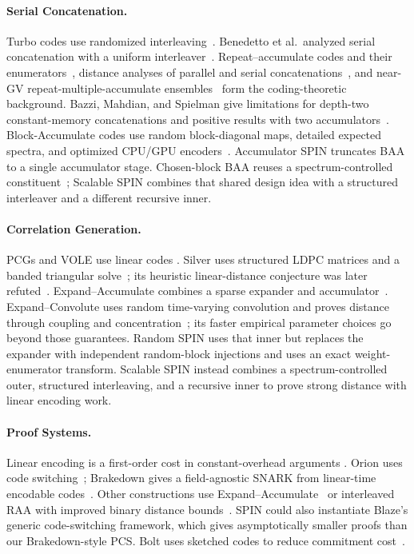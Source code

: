 \paragraph{Serial Concatenation.}
Turbo codes use randomized interleaving~\cite{berrou93}.
Benedetto et al.\ analyzed serial concatenation with a uniform
interleaver~\cite{benedetto98}. Repeat--accumulate codes and their
enumerators~\cite{divsalar98}, distance analyses of parallel and serial
concatenations~\cite{kahale98}, and near-GV repeat-multiple-accumulate
ensembles~\cite{kliewer08} form the coding-theoretic background.
Bazzi, Mahdian, and Spielman give limitations for depth-two constant-memory
concatenations and positive results with two accumulators~\cite{bms09}.
Block-Accumulate codes use random block-diagonal maps, detailed expected
spectra, and optimized CPU/GPU encoders~\cite{KolesnikovEtAl2026BA}.
Accumulator SPIN truncates BAA to a single accumulator stage.
Chosen-block BAA reuses a spectrum-controlled constituent~\cite{cryptoeprint:2026/1903};
Scalable SPIN combines that shared design idea with a structured interleaver
and a different recursive inner.

\paragraph{Correlation Generation.}
PCGs and VOLE use linear codes
\cite{bcgi18,bcg19pcg,bcg19tworound,ferret20,bcg20ring}.
Silver uses structured LDPC matrices and a banded triangular
solve~\cite{CouteauRindalRaghuraman2021Silver}; its heuristic
linear-distance conjecture was later refuted~\cite{RaghuramanRindalTanguy2023EC}.
Expand--Accumulate combines a sparse expander and accumulator~\cite{ea22}.
Expand--Convolute uses random time-varying convolution and proves distance
through coupling and concentration~\cite{RaghuramanRindalTanguy2023EC};
its faster empirical parameter choices go beyond those guarantees.
Random SPIN uses that inner but replaces the expander with independent
random-block injections and uses an exact weight-enumerator transform.
Scalable SPIN instead combines a spectrum-controlled outer, structured
interleaving, and a recursive inner to prove strong distance with linear encoding work.

\paragraph{Proof Systems.}
Linear encoding is a first-order cost in constant-overhead arguments
\cite{rr25}. Orion uses code switching~\cite{orion22}; Brakedown gives
a field-agnostic SNARK from linear-time encodable codes~\cite{brakedown23}.
Other constructions use Expand--Accumulate~\cite{fieldEA24} or
interleaved RAA with improved binary distance bounds~\cite{blaze25}.
SPIN could also instantiate Blaze's generic code-switching framework, which
gives asymptotically smaller proofs than our Brakedown-style PCS.
Bolt uses sketched codes to reduce commitment cost~\cite{bolt26}.


